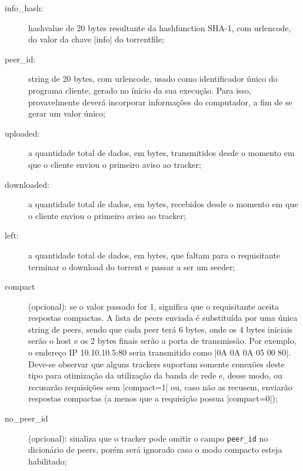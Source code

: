 \begin{description}
    \item[info\_hash:] \gls*{hashvalue} de 20 bytes resultante da \gls*{hashfunction}
        SHA-1, com \gls*{urlencode}, do valor da chave \bverb|info| do
        \gls*{torrentfile};

    \item[peer\_id:] \gls*{string} de 20 bytes, com \gls*{urlencode}, usado como
        identificador único do programa cliente, gerado no ínício da sua execução. Para
        isso, provavelmente deverá incorporar informações do computador, a fim de se
        gerar um valor único;

    \item[uploaded:] a quantidade total de dados, em bytes, transmitidos desde o
        momento em que o cliente enviou o primeiro aviso ao \gls*{tracker};

    \item[downloaded:] a quantidade total de dados, em bytes, recebidos desde o momento
        em que o cliente enviou o primeiro aviso ao \gls*{tracker};

    \item[left:] a quantidade total de dados, em bytes, que faltam para o requisitante
        terminar o download do \gls*{torrent} e passar a ser um \gls*{seeder};

    \item[compact] (opcional): se o valor passado for 1, significa que o requisitante
        aceita respostas compactas. A lista de \glspl*{peer} enviada é substituída por
        uma única \gls*{string} de \glspl*{peer}, sendo que cada \gls*{peer} terá 6
        bytes, onde os 4 bytes iniciais serão o host e os 2 bytes finais serão a porta
        de transmissão. Por exemplo, o endereço IP 10.10.10.5:80 seria transmitido como
        \bverb|0A 0A 0A 05 00 80|. Deve-se observar que alguns \glspl*{tracker} suportam
        somente conexões deste tipo para otimização da utilização da banda de rede e,
        desse modo, ou recusarão requisições sem \bverb|compact=1| ou, caso não as
        recusem, enviarão respostas compactas (a menos que a requisição possua
        \bverb|compact=0|);

    \item[no\_peer\_id] (opcional): sinaliza que o \gls*{tracker} pode omitir o
        campo \textcolor{Bittersweet}{\texttt{peer\_id}} no dicionário de \glspl*{peer},
        porém será ignorado caso o modo compacto esteja habilitado;


\end{description}

